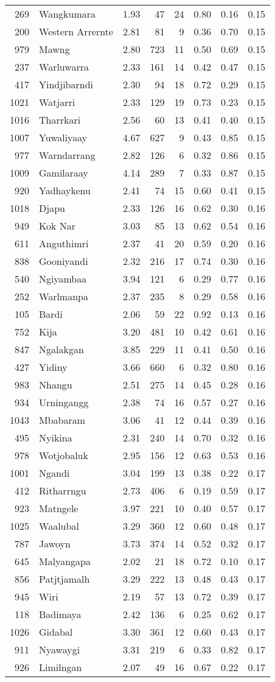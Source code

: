 \begin{longtable}[]{@{}rlrrrrrr@{}}
269 & Wangkumara & 1.93 & 47 & 24 & 0.80 & 0.16 & 0.15\tabularnewline
200 & Western Arrernte & 2.81 & 81 & 9 & 0.36 & 0.70 &
0.15\tabularnewline
979 & Mawng & 2.80 & 723 & 11 & 0.50 & 0.69 & 0.15\tabularnewline
237 & Warluwarra & 2.33 & 161 & 14 & 0.42 & 0.47 & 0.15\tabularnewline
417 & Yindjibarndi & 2.30 & 94 & 18 & 0.72 & 0.29 & 0.15\tabularnewline
1021 & Watjarri & 2.33 & 129 & 19 & 0.73 & 0.23 & 0.15\tabularnewline
1016 & Tharrkari & 2.56 & 60 & 13 & 0.41 & 0.40 & 0.15\tabularnewline
1007 & Yuwaliyaay & 4.67 & 627 & 9 & 0.43 & 0.85 & 0.15\tabularnewline
977 & Warndarrang & 2.82 & 126 & 6 & 0.32 & 0.86 & 0.15\tabularnewline
1009 & Gamilaraay & 4.14 & 289 & 7 & 0.33 & 0.87 & 0.15\tabularnewline
920 & Yadhaykenu & 2.41 & 74 & 15 & 0.60 & 0.41 & 0.15\tabularnewline
1018 & Djapu & 2.33 & 126 & 16 & 0.62 & 0.30 & 0.16\tabularnewline
949 & Kok Nar & 3.03 & 85 & 13 & 0.62 & 0.54 & 0.16\tabularnewline
611 & Anguthimri & 2.37 & 41 & 20 & 0.59 & 0.20 & 0.16\tabularnewline
838 & Gooniyandi & 2.32 & 216 & 17 & 0.74 & 0.30 & 0.16\tabularnewline
540 & Ngiyambaa & 3.94 & 121 & 6 & 0.29 & 0.77 & 0.16\tabularnewline
252 & Warlmanpa & 2.37 & 235 & 8 & 0.29 & 0.58 & 0.16\tabularnewline
105 & Bardi & 2.06 & 59 & 22 & 0.92 & 0.13 & 0.16\tabularnewline
752 & Kija & 3.20 & 481 & 10 & 0.42 & 0.61 & 0.16\tabularnewline
847 & Ngalakgan & 3.85 & 229 & 11 & 0.41 & 0.50 & 0.16\tabularnewline
427 & Yidiny & 3.66 & 660 & 6 & 0.32 & 0.80 & 0.16\tabularnewline
983 & Nhangu & 2.51 & 275 & 14 & 0.45 & 0.28 & 0.16\tabularnewline
934 & Urningangg & 2.38 & 74 & 16 & 0.57 & 0.27 & 0.16\tabularnewline
1043 & Mbabaram & 3.06 & 41 & 12 & 0.44 & 0.39 & 0.16\tabularnewline
495 & Nyikina & 2.31 & 240 & 14 & 0.70 & 0.32 & 0.16\tabularnewline
978 & Wotjobaluk & 2.95 & 156 & 12 & 0.63 & 0.53 & 0.16\tabularnewline
1001 & Ngandi & 3.04 & 199 & 13 & 0.38 & 0.22 & 0.17\tabularnewline
412 & Ritharrngu & 2.73 & 406 & 6 & 0.19 & 0.59 & 0.17\tabularnewline
923 & Matngele & 3.97 & 221 & 10 & 0.40 & 0.57 & 0.17\tabularnewline
1025 & Waalubal & 3.29 & 360 & 12 & 0.60 & 0.48 & 0.17\tabularnewline
787 & Jawoyn & 3.73 & 374 & 14 & 0.52 & 0.32 & 0.17\tabularnewline
645 & Malyangapa & 2.02 & 21 & 18 & 0.72 & 0.10 & 0.17\tabularnewline
856 & Patjtjamalh & 3.29 & 222 & 13 & 0.48 & 0.43 & 0.17\tabularnewline
945 & Wiri & 2.19 & 57 & 13 & 0.72 & 0.39 & 0.17\tabularnewline
118 & Badimaya & 2.42 & 136 & 6 & 0.25 & 0.62 & 0.17\tabularnewline
1026 & Gidabal & 3.30 & 361 & 12 & 0.60 & 0.43 & 0.17\tabularnewline
911 & Nyawaygi & 3.31 & 219 & 6 & 0.33 & 0.82 & 0.17\tabularnewline
926 & Limilngan & 2.07 & 49 & 16 & 0.67 & 0.22 & 0.17\tabularnewline

\end{longtable}
